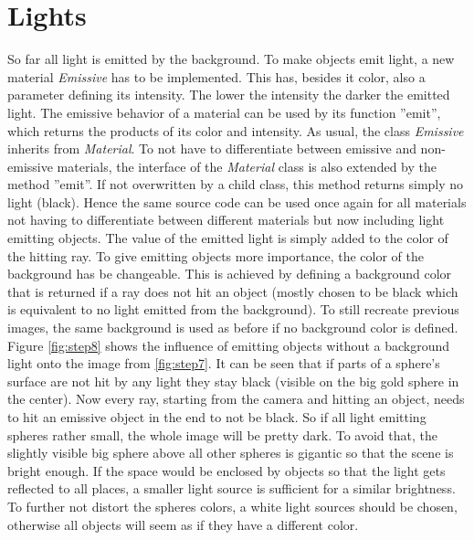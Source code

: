 \documentclass[12pt]{report}
\begin{document}
\chapter{Lights}
So far all light is emitted by the background. To make objects emit light, a new material \textit{Emissive} has to be implemented. This has, besides it color, also a parameter defining its intensity. The lower the intensity the darker the emitted light. The emissive behavior of a material can be used by its function ''emit'', which returns the products of its color and intensity. As usual, the class \textit{Emissive} inherits from \textit{Material}. To not have to differentiate between emissive and non-emissive materials, the interface of the \textit{Material} class is also extended by the method ''emit''. If not overwritten by a child class, this method returns simply no light (black). Hence the same source code can be used once again for all materials not having to differentiate between different materials but now including light emitting objects. The value of the emitted light is simply added to the color of the hitting ray. To give emitting objects more importance, the color of the background has be changeable. This is achieved by defining a background color that is returned if a ray does not hit an object (mostly chosen to be black which is equivalent to no light emitted from the background). To still recreate previous images, the same background is used as before if no background color is defined. Figure \ref{fig:step8} shows the influence of emitting objects without a background light onto the image from \ref{fig:step7}. It can be seen that if parts of a sphere's surface are not hit by any light they stay black (visible on the big gold sphere in the center). Now every ray, starting from the camera and hitting an object, needs to hit an emissive object in the end to not be black. So if all light emitting spheres rather small, the whole image will be pretty dark. To avoid that, the slightly visible big sphere above all other spheres is gigantic so that the scene is bright enough. If the space would be enclosed by objects so that the light gets reflected to all places, a smaller light source is sufficient for a similar brightness. To further not distort the spheres colors, a white light sources should be chosen, otherwise all objects will seem as if they have a different color.
\end{document}
